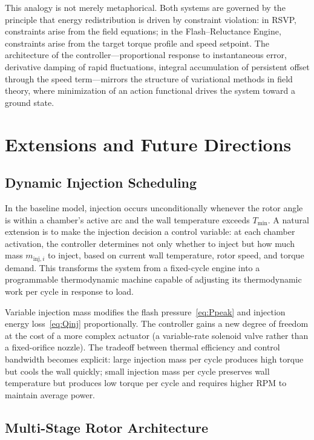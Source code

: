 \documentclass[11pt, a4paper]{article}
\theoremstyle{plain}
\theoremstyle{definition}
\begin{document}
This analogy is not merely metaphorical. Both systems are governed by the principle that energy redistribution is driven by constraint violation: in RSVP, constraints arise from the field equations; in the Flash--Reluctance Engine, constraints arise from the target torque profile and speed setpoint. The architecture of the controller---proportional response to instantaneous error, derivative damping of rapid fluctuations, integral accumulation of persistent offset through the speed term---mirrors the structure of variational methods in field theory, where minimization of an action functional drives the system toward a ground state.

\section{Extensions and Future Directions}
\label{sec:extensions}

\subsection{Dynamic Injection Scheduling}

In the baseline model, injection occurs unconditionally whenever the rotor angle is within a chamber's active arc and the wall temperature exceeds $T_{\mathrm{min}}$. A natural extension is to make the injection decision a control variable: at each chamber activation, the controller determines not only whether to inject but how much mass $m_{\mathrm{inj},i}$ to inject, based on current wall temperature, rotor speed, and torque demand. This transforms the system from a fixed-cycle engine into a programmable thermodynamic machine capable of adjusting its thermodynamic work per cycle in response to load.

Variable injection mass modifies the flash pressure~\eqref{eq:Ppeak} and injection energy loss~\eqref{eq:Qinj} proportionally. The controller gains a new degree of freedom at the cost of a more complex actuator (a variable-rate solenoid valve rather than a fixed-orifice nozzle). The tradeoff between thermal efficiency and control bandwidth becomes explicit: large injection mass per cycle produces high torque but cools the wall quickly; small injection mass per cycle preserves wall temperature but produces low torque per cycle and requires higher RPM to maintain average power.

\subsection{Multi-Stage Rotor Architecture}
\end{document}
